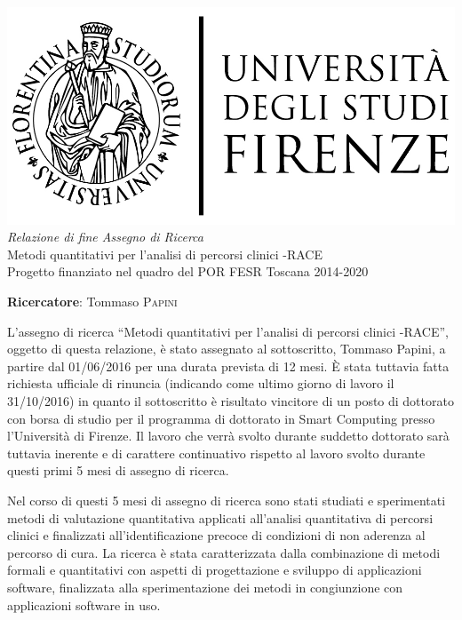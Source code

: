 \documentclass{article}
\begin{document}
    
    \begin{center}
        \includegraphics[scale=0.2]{logo_unifi.jpg}\\[4cm]
        \textit{Relazione di fine Assegno di Ricerca}\\[0.3cm]
        {\Huge Metodi quantitativi per l'analisi di percorsi clinici -RACE}\\[0.2cm]
        Progetto finanziato nel quadro del POR FESR Toscana 2014-2020
    \end{center}
    
    \vfill
    
    \textbf{Ricercatore}: Tommaso \textsc{Papini}
    
    \clearpage
    
    L'assegno di ricerca ``Metodi quantitativi per l'analisi di percorsi clinici -RACE'', oggetto di questa relazione, è stato assegnato al sottoscritto, Tommaso Papini, a partire dal 01/06/2016 per una durata prevista di 12 mesi. È stata tuttavia fatta richiesta ufficiale di rinuncia (indicando come ultimo giorno di lavoro il 31/10/2016) in quanto il sottoscritto è risultato vincitore di un posto di dottorato con borsa di studio per il programma di dottorato in Smart Computing presso l'Università di Firenze. Il lavoro che verrà svolto durante suddetto dottorato sarà tuttavia inerente e di carattere continuativo rispetto al lavoro svolto durante questi primi 5 mesi di assegno di ricerca.
    
    Nel corso di questi 5 mesi di assegno di ricerca sono stati studiati e sperimentati metodi di valutazione quantitativa applicati all'analisi quantitativa di percorsi clinici e finalizzati all'identificazione precoce di condizioni di non aderenza al percorso di cura. La ricerca è stata caratterizzata dalla combinazione di metodi formali e quantitativi con aspetti di progettazione e sviluppo di applicazioni software, finalizzata alla sperimentazione dei metodi in congiunzione con applicazioni software in uso.
    
\end{document}
